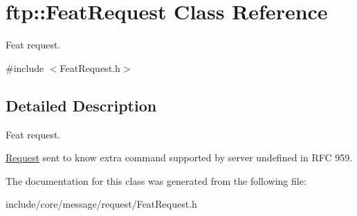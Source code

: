 \hypertarget{classftp_1_1_feat_request}{\section{ftp\-:\-:Feat\-Request Class Reference}
\label{classftp_1_1_feat_request}
}


Feat request.  




{\ttfamily \#include $<$Feat\-Request.\-h$>$}



\subsection{Detailed Description}
Feat request. 

\hyperlink{classftp_1_1_request}{Request} sent to know extra command supported by server undefined in R\-F\-C 959. 

The documentation for this class was generated from the following file\-:\begin{DoxyCompactItemize}
\item 
include/core/message/request/Feat\-Request.\-h\end{DoxyCompactItemize}
